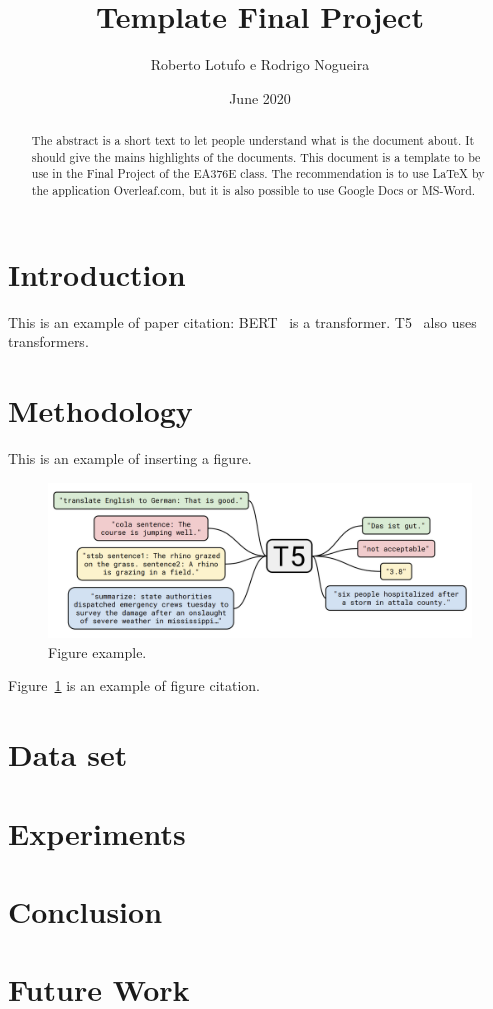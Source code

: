 \documentclass{article}
\title{Template Final Project}
\author{Roberto Lotufo e Rodrigo Nogueira }
\date{June 2020}
\begin{document}
\maketitle

\begin{abstract}
    The abstract is a short text to let people understand what is the document about.
    It should give the mains highlights of the documents.
    This document is a template to be use in the Final Project of the EA376E class.
    The recommendation is to use LaTeX by the application Overleaf.com, but it is also
    possible to use Google Docs or MS-Word.
\end{abstract}

\section{Introduction}

This is an example of paper citation: BERT~\cite{devlin2018bert} is a transformer. T5~\cite{raffel2019exploring} also uses transformers.

\section{Methodology} 

This is an example of inserting a figure. 

\begin{figure}[ht]
\centering
\includegraphics[width=.77\textwidth]{figures/t5.png}
\caption{\label{fig:t5}Figure example.}
\end{figure}

Figure~\ref{fig:t5} is an example of figure citation.

\section{Data set}

\section{Experiments}

\section{Conclusion}

\section{Future Work}



\end{document}
